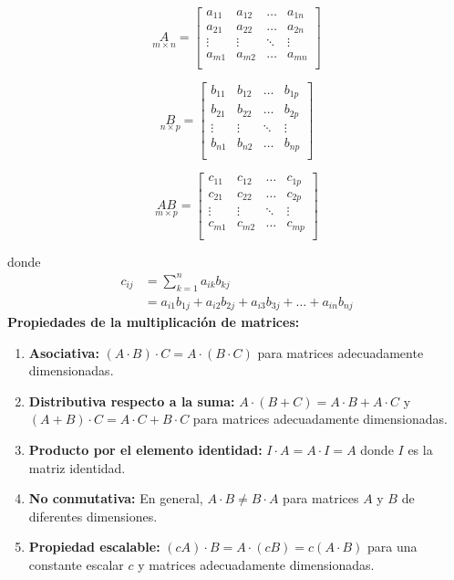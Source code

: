 \begin{minipage}[t]{0.3\textwidth}
\[
\underset{m \times n}{A} =
\begin{bmatrix}
    a_{11} & a_{12} & \dots & a_{1n} \\
    a_{21} & a_{22} & \dots & a_{2n} \\
    \vdots & \vdots & \ddots & \vdots \\
    a_{m1} & a_{m2} & \dots & a_{mn} \\
\end{bmatrix}
\]
\end{minipage}
\hfill
\begin{minipage}[t]{0.3\textwidth}
 \[
\underset{n \times p}{B} =
\begin{bmatrix}
    b_{11} & b_{12} & \dots & b_{1p} \\
    b_{21} & b_{22} & \dots & b_{2p} \\
    \vdots & \vdots & \ddots & \vdots \\
    b_{n1} & b_{n2} & \dots & b_{np} \\
\end{bmatrix}
\]
\end{minipage}
\hfill
\begin{minipage}[t]{0.3\textwidth}
\[
\underset{m \times p}{AB} =
\begin{bmatrix}
    c_{11} & c_{12} & \dots & c_{1p} \\
    c_{21} & c_{22} & \dots & c_{2p} \\
    \vdots & \vdots & \ddots & \vdots \\
    c_{m1} & c_{m2} & \dots & c_{mp} \\
\end{bmatrix}
\]
\end{minipage}

donde 
 $$
\begin{aligned}
c_{ij} & = \sum_{k=1}^{n} a_{ik}b_{kj} \\
       & = a_{i1}b_{1j} + a_{i2}b_{2j} + a_{i3}b_{3j} + \dots + a_{in}b_{nj}
\end{aligned}
$$
\textbf{Propiedades de la multiplicación de matrices:}

\begin{enumerate}
\item \textbf{Asociativa:} $(A \cdot B) \cdot C = A \cdot (B \cdot C)$ para matrices adecuadamente dimensionadas.
\item \textbf{Distributiva respecto a la suma:} $A \cdot (B + C) = A \cdot B + A \cdot C$ y $(A + B) \cdot C = A \cdot C + B \cdot C$ para matrices adecuadamente dimensionadas.
\item \textbf{Producto por el elemento identidad:} $I \cdot A = A \cdot I = A$ donde $I$ es la matriz identidad.
\item \textbf{No conmutativa:} En general, $A \cdot B \neq B \cdot A$ para matrices $A$ y $B$ de diferentes dimensiones.
\item \textbf{Propiedad escalable:} $(cA) \cdot B = A \cdot (cB) = c(A \cdot B)$ para una constante escalar $c$ y matrices adecuadamente dimensionadas.
\end{enumerate}


